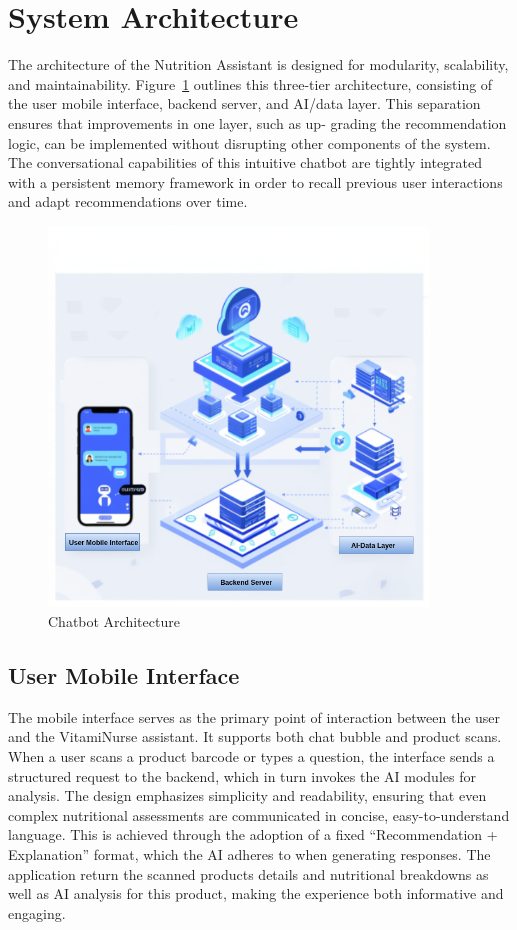 \section{System Architecture}
The architecture of the Nutrition Assistant is designed for modularity, scalability, and maintainability. Figure~\ref{fig:chatbot Architect} outlines this three-tier architecture, consisting of the user mobile interface, backend server, and AI/data layer.
 This separation ensures that improvements in one layer, such as up-
grading the recommendation logic, can be implemented without disrupting other components of the system. The conversational capabilities of this intuitive chatbot are tightly integrated with a persistent memory framework in order to recall previous user interactions and adapt recommendations over time.  
 \begin{center}
    \begin{figure}[H]
    \includegraphics[width=0.9\textwidth]{images/chat_layers.png}
    \caption{Chatbot Architecture} 
    \label{fig:chatbot Architect}
\end{figure}
\end{center}

\subsection{User Mobile Interface}
The mobile interface serves as the primary point of interaction between the user and the VitamiNurse assistant. It supports both chat bubble and product scans. When a user scans a product barcode or types a question, the interface sends a structured request to the backend, which in turn invokes the AI modules for analysis. The design emphasizes simplicity and readability, ensuring that even complex nutritional assessments are communicated in concise, easy-to-understand language. This is achieved through the adoption of a fixed “Recommendation + Explanation” format, which the AI adheres to when generating responses. The application return the scanned products details and nutritional breakdowns as well as AI analysis for this product, making the experience both informative and engaging.

